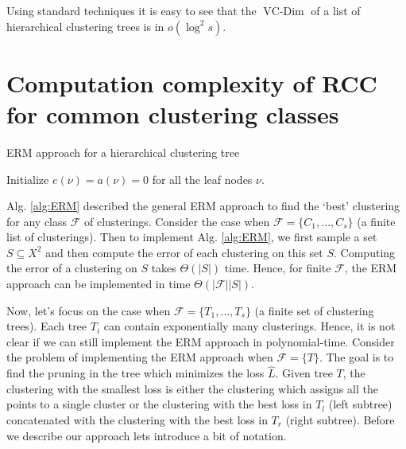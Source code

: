 \documentclass[12pt]{article}
\newcommand{\mc}{\mathcal}
\DeclareMathOperator*{\vcdim}{VC-Dim}
\begin{document}
\noindent Using standard techniques it is easy to see that the $\vcdim$ of a list of hierarchical clustering trees is in $o( \log^2 s)$. 

\section{Computation complexity of RCC for common clustering classes}
\label{section:efficientERM}

\SetAlgoNoLine
\LinesNumbered
\SetNlSkip{-0.4em}
\begin{algorithm}[h]
\caption{ERM approach for a hierarchical clustering tree}
\label{alg:ERMTrees}
\Indp{}

\vspace{0.1in} Initialize $e(\nu) = a(\nu) = 0$ for all the leaf nodes $\nu$. \\
\end{algorithm}

Alg. \ref{alg:ERM} described the general ERM approach to find the `best' clustering for any class $\mc F$ of clusterings. Consider the case when $\mc F = \{C_1, \ldots, C_s\}$ (a finite list of clusterings). Then to implement Alg. \ref{alg:ERM}, we first sample a set $S \subseteq X^2$ and then compute the error of each clustering on this set $S$. Computing the error of a clustering on $S$ takes $\Theta(|S|)$ time. Hence, for finite $\mc F$, the ERM approach can be implemented in time $\Theta(|\mc F| |S|)$. 

Now, let's focus on the case when $\mc F = \{T_1, \ldots, T_s\}$ (a finite set of clustering trees). Each tree $T_i$ can contain exponentially many clusterings. Hence, it is not clear if we can still implement the ERM approach in polynomial-time. Consider the problem of implementing the ERM approach when $\mc F = \{T\}$. The goal is to find the pruning in the tree which minimizes the loss $\hat L$. Given tree $T$, the clustering with the smallest loss is either the clustering which assigns all the points to a single cluster or the clustering with the best loss in $T_l$ (left subtree) concatenated with the clustering with the best loss in $T_r$ (right subtree). Before we describe our approach lets introduce a bit of notation.
\end{document}
